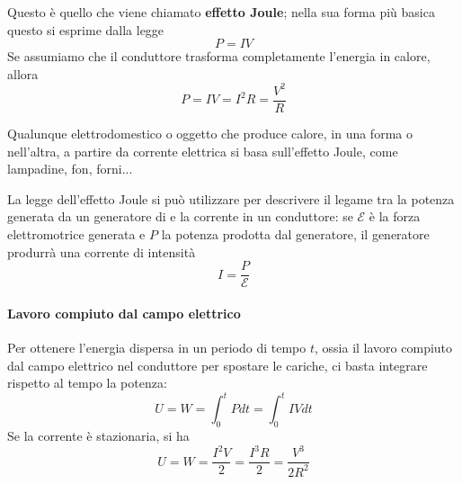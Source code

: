 Questo è quello che viene chiamato \textbf{effetto Joule}; nella sua forma più basica questo si esprime dalla legge
\begin{equation}
	P=IV
\end{equation}
Se assumiamo che il conduttore trasforma completamente l'energia in calore, allora
\begin{equation}
	P=IV=I^2R=\frac{V^2}{R}
\end{equation}
\begin{example}
	Qualunque elettrodomestico o oggetto che produce calore, in una forma o nell'altra, a partire da corrente elettrica si basa sull'effetto Joule, come lampadine, fon, forni...
\end{example}
\begin{observe}
	La legge dell'effetto Joule si può utilizzare per descrivere il legame tra la potenza generata da un generatore di \fem e la corrente in un conduttore: se $\mathcal{E}$ è la forza elettromotrice generata e $P$ la potenza prodotta dal generatore, il generatore produrrà una corrente di intensità
	\begin{equation}
		I=\frac{P}{\mathcal{E}}
	\end{equation}
\end{observe}
\paragraph{Lavoro compiuto dal campo elettrico}
Per ottenere l'energia dispersa in un periodo di tempo $t$, ossia il lavoro compiuto dal campo elettrico nel conduttore per spostare le cariche, ci basta integrare rispetto al tempo la potenza:
\begin{equation}
	U=W=\int_{0}^{t}Pdt=\int_{0}^t IVdt
\end{equation}
Se la corrente è stazionaria, si ha
\begin{equation}
	U=W=\frac{I^2V}{2}=\frac{I^3R}{2}=\frac{V^3}{2R^2}
\end{equation}
